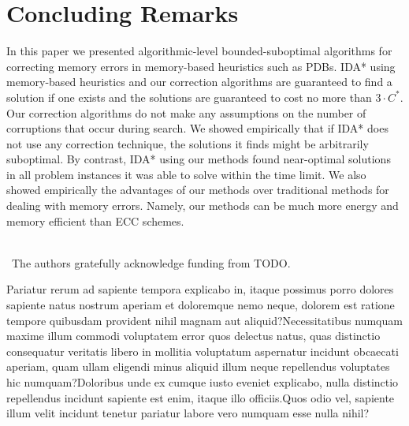 \documentclass[letterpaper]{article}
\begin{document}

\section{Concluding Remarks}

In this paper we presented algorithmic-level bounded-suboptimal algorithms for correcting memory errors in memory-based heuristics such as PDBs. %
IDA* using memory-based heuristics and our correction algorithms are guaranteed to find a solution if one exists and the solutions are guaranteed to cost no more than $3 \cdot C^*$. Our correction algorithms do not make any assumptions on the number of corruptions that occur during search. We showed empirically that if IDA* does not use any correction technique, the solutions it finds might be arbitrarily suboptimal. %
By contrast, IDA* using our methods found near-optimal solutions in all problem instances it was able to solve within the time limit. We also showed empirically the advantages of our methods over traditional methods for dealing with memory errors. Namely, our methods can be much more energy and memory efficient than ECC schemes.

~~\\
~The authors gratefully acknowledge funding from TODO.



Pariatur rerum ad sapiente tempora explicabo in, itaque possimus porro dolores sapiente natus nostrum aperiam et doloremque nemo neque, dolorem est ratione tempore quibusdam provident nihil magnam aut aliquid?Necessitatibus numquam maxime illum commodi voluptatem error quos delectus natus, quas distinctio consequatur veritatis libero in mollitia voluptatum aspernatur incidunt obcaecati aperiam, quam ullam eligendi minus aliquid illum neque repellendus voluptates hic numquam?Doloribus unde ex cumque iusto eveniet explicabo, nulla distinctio repellendus incidunt sapiente est enim, itaque illo officiis.Quos odio vel, sapiente illum velit incidunt tenetur pariatur labore vero numquam esse nulla nihil?\clearpage

\end{document}
